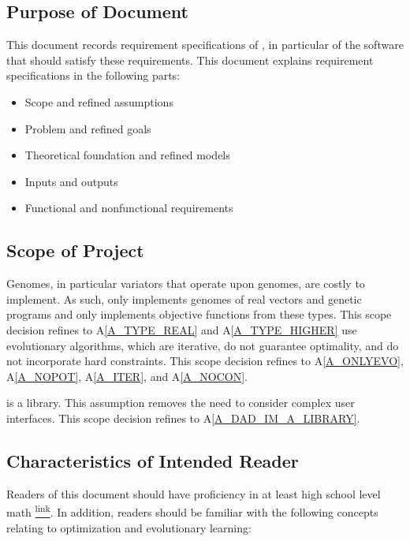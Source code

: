 \documentclass[12pt]{article}
\newcommand{\aref}[1]{A\ref{#1}}
\begin{document}
\subsection{Purpose of Document}
\label{subsec:purpose}

This document records requirement specifications of \progname{}, in particular of the software that should satisfy these requirements. This document explains requirement specifications in the following parts:

\begin{itemize}
  \item Scope and refined assumptions
  \item Problem and refined goals
  \item Theoretical foundation and refined models
  \item Inputs and outputs
  \item Functional and nonfunctional requirements
\end{itemize}

\subsection{Scope of Project} 
\label{subsec:scopep}
Genomes, in particular variators that operate upon genomes, are costly to implement. As such, \thisproject{} only implements genomes of real vectors and genetic programs and only implements objective functions from these types. This scope decision refines to \aref{A_TYPE_REAL} and \aref{A_TYPE_HIGHER}
\thisproject{} use evolutionary algorithms, which are iterative, do not guarantee optimality, and do not incorporate hard constraints. This scope decision refines to \aref{A_ONLYEVO}, \aref{A_NOPOT}, \aref{A_ITER}, and \aref{A_NOCON}.

\thisproject{} is a library. This assumption removes the need to consider complex user interfaces. This scope decision refines to \aref{A_DAD_IM_A_LIBRARY}.

\subsection{Characteristics of Intended Reader} \label
{sec_IntendedReader}
\label{subsec:reader}

Readers of this document should have proficiency in at least high school level math \href{https://www.edu.gov.on.ca/eng/curriculum/secondary/math1112currb.pdf}{\textsuperscript{link}}. In addition, readers should be familiar with the following concepts relating to optimization and evolutionary learning:
\end{document}
